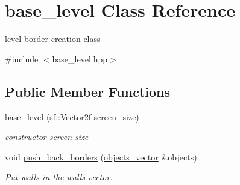 \hypertarget{classbase__level}{}\section{base\+\_\+level Class Reference}
\label{classbase__level}


level border creation class  




{\ttfamily \#include $<$base\+\_\+level.\+hpp$>$}

\subsection*{Public Member Functions}
\begin{DoxyCompactItemize}
\item 
\hyperlink{classbase__level_addf165fdc5f4e953be3b6a2dcd00459b}{base\+\_\+level} (sf\+::\+Vector2f screen\+\_\+size)
\begin{DoxyCompactList}\small\item\em constructor screen size \end{DoxyCompactList}\item 
void \hyperlink{classbase__level_a3b2da28cf45cad434103e81ee6c4538d}{push\+\_\+back\+\_\+borders} (\hyperlink{drawable_8hpp_a6c0fdb1dfd0c34dbbdbb5dcd3c608b07}{objects\+\_\+vector} \&objects)
\begin{DoxyCompactList}\small\item\em Put walls in the walls vector. \end{DoxyCompactList}\end{DoxyCompactItemize}
